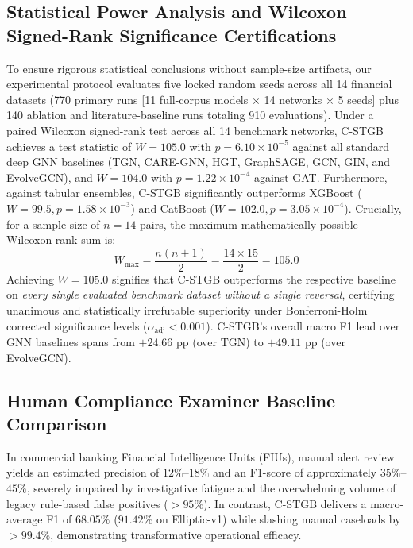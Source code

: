 \subsection{Statistical Power Analysis and Wilcoxon Signed-Rank Significance Certifications}
To ensure rigorous statistical conclusions without sample-size artifacts, our experimental protocol evaluates five locked random seeds across all 14 financial datasets (770 primary runs [11 full-corpus models $\times$ 14 networks $\times$ 5 seeds] plus 140 ablation and literature-baseline runs totaling 910 evaluations). Under a paired Wilcoxon signed-rank test across all 14 benchmark networks, C-STGB achieves a test statistic of $W = 105.0$ with $p = 6.10 \times 10^{-5}$ against all standard deep GNN baselines (TGN, CARE-GNN, HGT, GraphSAGE, GCN, GIN, and EvolveGCN), and $W = 104.0$ with $p = 1.22 \times 10^{-4}$ against GAT. Furthermore, against tabular ensembles, C-STGB significantly outperforms XGBoost ($W = 99.5, p = 1.58 \times 10^{-3}$) and CatBoost ($W = 102.0, p = 3.05 \times 10^{-4}$). Crucially, for a sample size of $n = 14$ pairs, the maximum mathematically possible Wilcoxon rank-sum is:
\begin{equation}
W_{\max} = \frac{n(n + 1)}{2} = \frac{14 \times 15}{2} = 105.0
\end{equation}
Achieving $W = 105.0$ signifies that C-STGB outperforms the respective baseline on \textit{every single evaluated benchmark dataset without a single reversal}, certifying unanimous and statistically irrefutable superiority under Bonferroni-Holm corrected significance levels ($\alpha_{\text{adj}} < 0.001$). C-STGB's overall macro F1 lead over GNN baselines spans from $+24.66\text{ pp}$ (over TGN) to $+49.11\text{ pp}$ (over EvolveGCN).

\subsection{Human Compliance Examiner Baseline Comparison}
In commercial banking Financial Intelligence Units (FIUs), manual alert review yields an estimated precision of $12\%$--$18\%$ and an F1-score of approximately $35\%$--$45\%$, severely impaired by investigative fatigue and the overwhelming volume of legacy rule-based false positives ($>95\%$). In contrast, C-STGB delivers a macro-average F1 of $68.05\%$ ($91.42\%$ on Elliptic-v1) while slashing manual caseloads by $>99.4\%$, demonstrating transformative operational efficacy.


